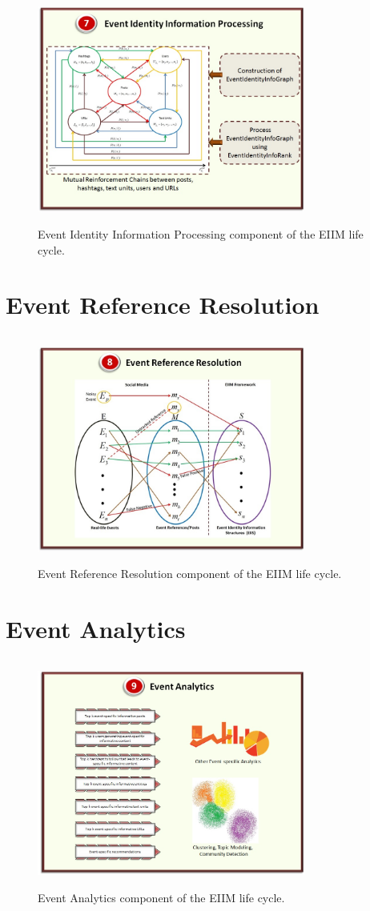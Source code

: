 \begin{figure}[htbp]
  \caption{Event Identity Information Processing component of the EIIM life cycle.}
  \centering
    \includegraphics[width=8.8cm,height=7.5cm]{Figures/EIIMComponents/EventIdentityInformationProcessing.jpg}
\end{figure}

\section{Event Reference Resolution}

\begin{figure}[htbp]
  \caption{Event Reference Resolution component of the EIIM life cycle.}
  \centering
    \includegraphics[width=8.8cm,height=7.5cm]{Figures/EIIMComponents/EventReferenceResolution.jpg}
\end{figure}

\section{Event Analytics}
\begin{figure}[htbp]
  \caption{Event Analytics component of the EIIM life cycle.}
  \centering
    \includegraphics[width=8.8cm,height=7.5cm]{Figures/EIIMComponents/EventAnalytics.jpg}
\end{figure}